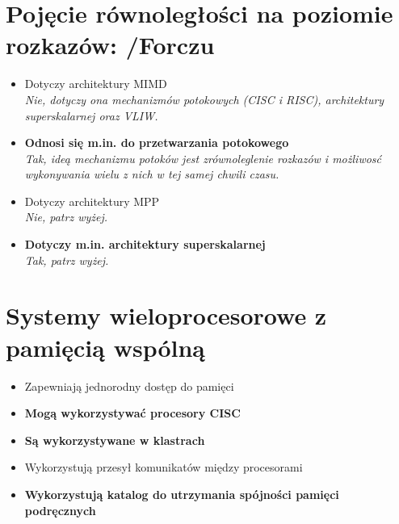 \documentclass[a4paper,twoside]{article}
\begin{document}
\section{Pojęcie równoległości na poziomie rozkazów: {\small /Forczu}}
	\begin{itemize}
    \item Dotyczy architektury MIMD\\
    {\small \emph{Nie, dotyczy ona mechanizmów potokowych (CISC i RISC), architektury superskalarnej oraz VLIW.}}
    \item \textbf{Odnosi się m.in. do przetwarzania potokowego}\\
    {\small \emph{Tak, ideą mechanizmu potoków jest zrównoleglenie rozkazów i możliwosć wykonywania wielu z nich w tej samej chwili czasu.}}
    \item Dotyczy architektury MPP\\
    {\small \emph{Nie, patrz wyżej.}}
    \item \textbf{Dotyczy m.in. architektury superskalarnej}\\
    {\small \emph{Tak, patrz wyżej.}}
    \end{itemize}

\section{Systemy wieloprocesorowe z pamięcią wspólną}
	\begin{itemize}
    \item Zapewniają jednorodny dostęp do pamięci
    \item \textbf{Mogą wykorzystywać procesory CISC}
    \item \textbf{Są wykorzystywane w klastrach}
    \item Wykorzystują przesył komunikatów między procesorami
    \item \textbf{Wykorzystują katalog do utrzymania spójności pamięci podręcznych}
    \end{itemize}

\end{document}
